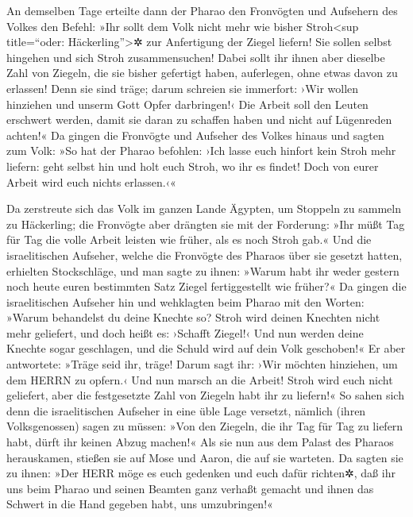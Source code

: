 An demselben Tage erteilte dann der Pharao den Fronvögten
und Aufsehern des Volkes den Befehl:  »Ihr sollt dem Volk
nicht mehr wie bisher Stroh\textless sup title=``oder:
Häckerling''\textgreater✲ zur Anfertigung der Ziegel liefern! Sie sollen
selbst hingehen und sich Stroh zusammensuchen!  Dabei
sollt ihr ihnen aber dieselbe Zahl von Ziegeln, die sie bisher gefertigt
haben, auferlegen, ohne etwas davon zu erlassen! Denn sie sind träge;
darum schreien sie immerfort: ›Wir wollen hinziehen und unserm Gott
Opfer darbringen!‹  Die Arbeit soll den Leuten erschwert
werden, damit sie daran zu schaffen haben und nicht auf Lügenreden
achten!«  Da gingen die Fronvögte und Aufseher des Volkes
hinaus und sagten zum Volk: »So hat der Pharao befohlen: ›Ich lasse euch
hinfort kein Stroh mehr liefern:  geht selbst hin und
holt euch Stroh, wo ihr es findet! Doch von eurer Arbeit wird euch
nichts erlassen.‹«

 Da zerstreute sich das Volk im ganzen Lande Ägypten, um
Stoppeln zu sammeln zu Häckerling;  die Fronvögte aber
drängten sie mit der Forderung: »Ihr müßt Tag für Tag die volle Arbeit
leisten wie früher, als es noch Stroh gab.«  Und die
israelitischen Aufseher, welche die Fronvögte des Pharaos über sie
gesetzt hatten, erhielten Stockschläge, und man sagte zu ihnen: »Warum
habt ihr weder gestern noch heute euren bestimmten Satz Ziegel
fertiggestellt wie früher?«  Da gingen die israelitischen
Aufseher hin und wehklagten beim Pharao mit den Worten: »Warum
behandelst du deine Knechte so?  Stroh wird deinen
Knechten nicht mehr geliefert, und doch heißt es: ›Schafft Ziegel!‹ Und
nun werden deine Knechte sogar geschlagen, und die Schuld wird auf dein
Volk geschoben!«  Er aber antwortete: »Träge seid ihr,
träge! Darum sagt ihr: ›Wir möchten hinziehen, um dem HERRN zu opfern.‹
 Und nun marsch an die Arbeit! Stroh wird euch nicht
geliefert, aber die festgesetzte Zahl von Ziegeln habt ihr zu liefern!«
 So sahen sich denn die israelitischen Aufseher in eine
üble Lage versetzt, nämlich (ihren Volksgenossen) sagen zu müssen: »Von
den Ziegeln, die ihr Tag für Tag zu liefern habt, dürft ihr keinen Abzug
machen!«  Als sie nun aus dem Palast des Pharaos
herauskamen, stießen sie auf Mose und Aaron, die auf sie warteten.
 Da sagten sie zu ihnen: »Der HERR möge es euch gedenken
und euch dafür richten✲, daß ihr uns beim Pharao und seinen Beamten ganz
verhaßt gemacht und ihnen das Schwert in die Hand gegeben habt, uns
umzubringen!«

